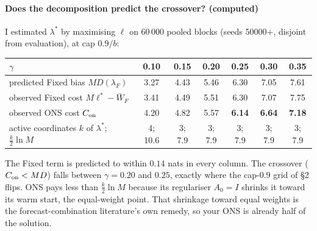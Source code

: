 \documentclass[11pt]{article}
\begin{document}
\paragraph{Does the decomposition predict the crossover? (computed)}
I estimated $\lambda^\ast$ by maximising $\ell$ on 60\,000 pooled blocks (seeds 50000+, disjoint from evaluation), at cap $0.9/b$:
\begin{center}\small
\begin{tabular}{lcccccc}
\toprule
$\gamma$ & 0.10 & 0.15 & 0.20 & 0.25 & 0.30 & 0.35\\
\midrule
predicted Fixed bias $M D(\lambda_F)$ & 3.27 & 4.43 & 5.46 & 6.30 & 7.05 & 7.61\\
observed Fixed cost $M\ell^\ast-\bar W_F$ & 3.41 & 4.49 & 5.51 & 6.30 & 7.07 & 7.75\\
observed ONS cost $C_{\rm on}$ & 4.20 & 4.82 & 5.57 & \textbf{6.14} & \textbf{6.64} & \textbf{7.18}\\
active coordinates $k$ of $\lambda^\ast$; $\tfrac k2\ln M$ & 4; 10.6 & 3; 7.9 & 3; 7.9 & 3; 7.9 & 3; 7.9 & 3; 7.9\\
\bottomrule
\end{tabular}
\end{center}
The Fixed term is predicted to within $0.14$ nats in every column. The crossover ($C_{\rm on}<MD$) falls between $\gamma=0.20$ and $0.25$, exactly where the cap-$0.9$ grid of \S2 flips. ONS pays less than $\tfrac k2\ln M$ because its regulariser $A_0=I$ shrinks it toward its warm start, the equal-weight point. That shrinkage toward equal weights is the forecast-combination literature's own remedy, so your ONS is already half of the solution.
\end{document}
